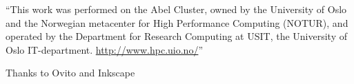 \begin{acknowledgements}
``This work was performed on the Abel Cluster, owned by the University of Oslo and the Norwegian metacenter for High Performance Computing (NOTUR), and operated by the Department for Research Computing at USIT, the University of Oslo IT-department. \url{http://www.hpc.uio.no/}'' 

Thanks to Ovito\cite{stukowski2010ovito} and Inkscape\cite{webinkscape}

\end{acknowledgements}
